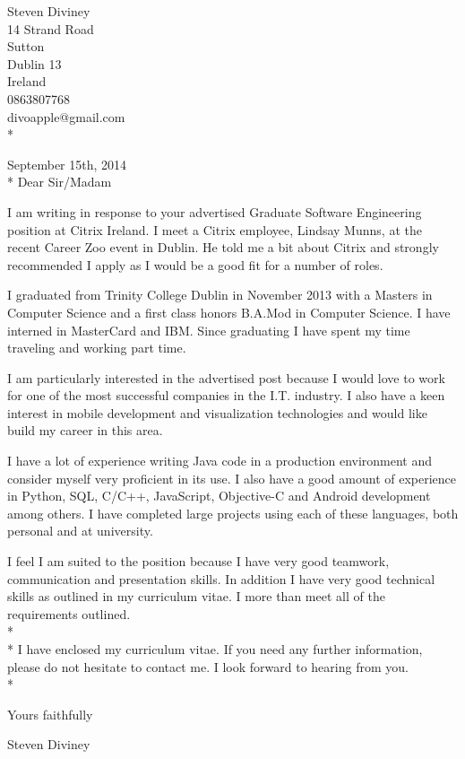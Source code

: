 \documentclass{res}
\begin{document}
 
\begin{resume}

\begin{flushright}
   Steven Diviney \\
   14 Strand Road \\
   Sutton \\
   Dublin 13 \\
   Ireland \\
   0863807768 \\
   divoapple@gmail.com \\* \vspace{10 mm}
\end{flushright}
\begin{flushleft}
 
September 15th, 2014\\*\vspace{10 mm}
Dear Sir/Madam
\end{flushleft}

I am writing in response to your advertised Graduate Software Engineering position at Citrix Ireland. I meet a Citrix employee, Lindsay Munns, at the recent Career Zoo event in Dublin. He told me a bit about Citrix and strongly recommended I apply as I would be a good fit for a number of roles.

I graduated from Trinity College Dublin in November 2013 with a Masters in Computer Science and a first class honors B.A.Mod in Computer Science. I have interned in MasterCard and IBM. Since graduating I have spent my time traveling and working part time.

I am particularly interested in the advertised post because I would love to work for one of the most successful companies in the I.T. industry. I also have a keen interest in mobile development and visualization technologies and would like build my career in this area.

I have a lot of experience writing Java code in a production environment and consider myself very proficient in its use. I also have a good amount of experience in Python, SQL, C/C++, JavaScript, Objective-C and Android development among others. I have completed large projects using each of these languages, both personal and at university. 

I feel I am suited to the position because I have very good teamwork, communication and presentation skills. In addition I have very good technical skills as outlined in my curriculum vitae. I more than meet all of the requirements outlined.
\\*
\\*
I have enclosed my curriculum vitae. If you need any further information, please do not hesitate to contact me. I look forward to hearing from you.\\*

\begin{flushleft}
Yours faithfully\\\vspace{10mm}

Steven Diviney\\
\end{flushleft}

\end{resume}
\end{document}
